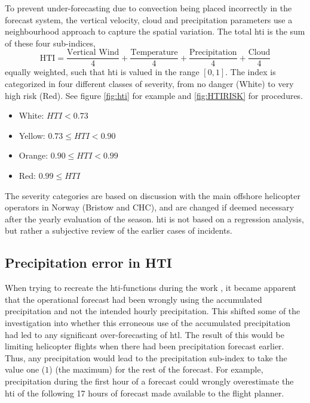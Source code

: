 To prevent under-forecasting due to convection being placed incorrectly in the forecast system, the vertical velocity, cloud and precipitation parameters use a neighbourhood approach to capture the spatial variation. The total \acrshort{hti} is the sum of these four sub-indices, \[\text{HTI} = \frac{\text{Vertical Wind}}{4} + \frac{\text{Temperature}}{4} + \frac{\text{Precipitation}}{4} +\frac{\text{Cloud}}{4}\] equally weighted, such that \acrshort{hti} is valued in the range $[0,1]$. The index is categorized in four different classes of severity, from no danger (White) to very high risk (Red). See figure \ref{fig:hti} for example and \ref{fig:HTIRISK} for procedures.
\begin{itemize}
    \item White: $HTI < 0.73$
    \item Yellow: $0.73 \leq HTI < 0.90 $
    \item Orange: $0.90 \leq HTI < 0.99 $
    \item Red: $0.99 \leq HTI $
\end{itemize}
The severity categories are based on discussion with the main offshore helicopter operators in Norway (Bristow and CHC), and are changed if deemed necessary after the yearly evaluation of the season. \acrshort{hti} is not based on a regression analysis, but rather a subjective review of the earlier cases of incidents. 

\subsection{Precipitation error in HTI}\label{sec:precipbug}

When trying to recreate the \acrshort{hti}-functions during the work , it became apparent that the operational forecast had been wrongly using the accumulated precipitation and not the intended hourly precipitation. This shifted some of the investigation into whether this erroneous use of the accumulated precipitation had led to any significant over-forecasting of \acrshort{htl}. The result of this would be limiting helicopter flights when there had been precipitation forecast earlier. Thus, any precipitation would lead to the precipitation sub-index to take the value one ($1$) (the maximum) for the rest of the forecast. For example, precipitation during the first hour of a forecast could wrongly overestimate the \acrshort{hti} of the following 17 hours of forecast made available to the flight planner. 

